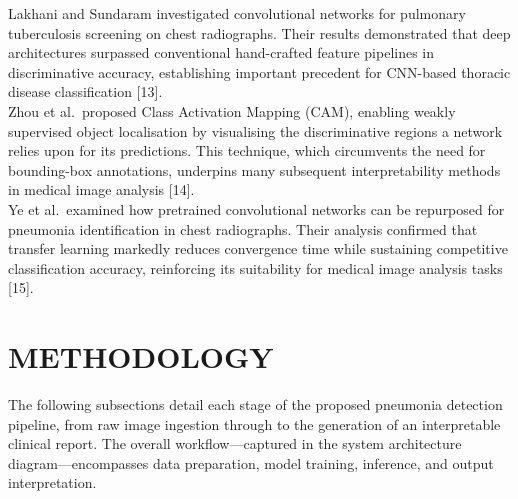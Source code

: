 \documentclass[conference]{IEEEtran}
\begin{document}
Lakhani and Sundaram investigated convolutional networks for pulmonary tuberculosis screening on chest radiographs. Their results demonstrated that deep architectures surpassed conventional hand-crafted feature pipelines in discriminative accuracy, establishing important precedent for CNN-based thoracic disease classification [13].\\
Zhou et al.\ proposed Class Activation Mapping (CAM), enabling weakly supervised object localisation by visualising the discriminative regions a network relies upon for its predictions. This technique, which circumvents the need for bounding-box annotations, underpins many subsequent interpretability methods in medical image analysis [14].\\
Ye et al.\ examined how pretrained convolutional networks can be repurposed for pneumonia identification in chest radiographs. Their analysis confirmed that transfer learning markedly reduces convergence time while sustaining competitive classification accuracy, reinforcing its suitability for medical image analysis tasks [15].\\

\section{\textbf{METHODOLOGY}}
\hspace{0.5cm}The following subsections detail each stage of the proposed pneumonia detection pipeline, from raw image ingestion through to the generation of an interpretable clinical report. The overall workflow—captured in the system architecture diagram—encompasses data preparation, model training, inference, and output interpretation.
\end{document}
